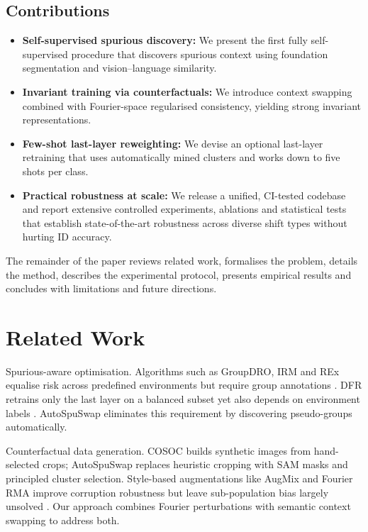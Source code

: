 \documentclass{article}
\begin{document}
\subsection{Contributions}
\begin{itemize}
    \item \textbf{Self-supervised spurious discovery:} We present the first fully self-supervised procedure that discovers spurious context using foundation segmentation and vision–language similarity.
    \item \textbf{Invariant training via counterfactuals:} We introduce context swapping combined with Fourier-space regularised consistency, yielding strong invariant representations.
    \item \textbf{Few-shot last-layer reweighting:} We devise an optional last-layer retraining that uses automatically mined clusters and works down to five shots per class.
    \item \textbf{Practical robustness at scale:} We release a unified, CI-tested codebase and report extensive controlled experiments, ablations and statistical tests that establish state-of-the-art robustness across diverse shift types without hurting ID accuracy.
\end{itemize}

The remainder of the paper reviews related work, formalises the problem, details the method, describes the experimental protocol, presents empirical results and concludes with limitations and future directions.

\section{Related Work}
Spurious-aware optimisation. Algorithms such as GroupDRO, IRM and REx equalise risk across predefined environments but require group annotations \cite{arjovsky-2019-invariant}. DFR retrains only the last layer on a balanced subset yet also depends on environment labels \cite{kirichenko-2022-last}. AutoSpuSwap eliminates this requirement by discovering pseudo-groups automatically.

Counterfactual data generation. COSOC builds synthetic images from hand-selected crops; AutoSpuSwap replaces heuristic cropping with SAM masks and principled cluster selection. Style-based augmentations like AugMix and Fourier RMA improve corruption robustness but leave sub-population bias largely unsolved \cite{fridovichkeil-2022-models}. Our approach combines Fourier perturbations with semantic context swapping to address both.
\end{document}
